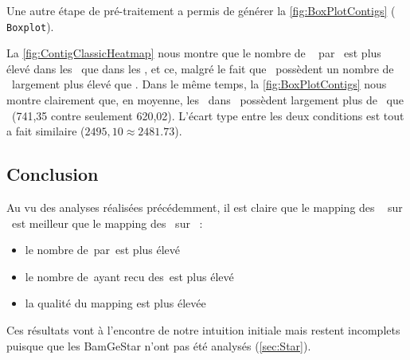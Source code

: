 \documentclass[../main]{subfiles} %
\begin{document}
Une autre étape de pré-traitement a permis de générer la \cref{fig:BoxPlotContigs} (\cite{florent_f-marchalm1bioinfointernship2024-inrae_agap_ge2pop_2024} \lstinline{Boxplot}).

La \cref{fig:ContigClassicHeatmap} nous montre que le nombre de \reads  par \contigs est plus élevé dans les \BamTrEx que dans les \BamTrMo, et ce, malgré le fait que \TrMo possèdent un nombre de \contigs largement plus élevé que \TrEx. Dans le même temps, la \cref{fig:BoxPlotContigs} nous montre clairement que, en moyenne, les \contig dans \BamTrEx possèdent largement plus de \reads que \BamTrMo (741,35 contre seulement 620,02). L'écart type entre les deux conditions est tout a fait similaire ($2495,10 \approx 2481.73$).





\subsection{Conclusion}
\label{sec:MapConclusion}
Au vu des analyses réalisées précédemment, il est claire que le \gls{mapping} des \fastq  sur \TrEx est meilleur que le \gls{mapping} des \fastq sur \TrMo :
\begin{itemize}
    \item le nombre de \reads\,par \contigs\,est plus élevé 
    \item le nombre de \contigs\,ayant recu des \reads\,est plus élevé 
    \item la qualité du \gls{mapping} est plus élevée
\end{itemize}

Ces résultats vont à l'encontre de notre intuition initiale mais restent incomplets puisque que les \acrshort{BamGeStar} n'ont pas été analysés (\cref{sec:Star}).

\end{document}
